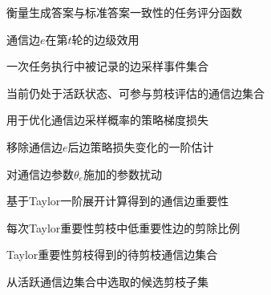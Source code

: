 \begin{symbols}
  \item[$S(\hat{y},y)$] 衡量生成答案与标准答案一致性的任务评分函数
  \item[$R_e^{(t)}$] 通信边$e$在第$t$轮的边级效用
  \item[$\mathcal{E}_{\mathrm{sample}}$] 一次任务执行中被记录的边采样事件集合
  \item[$\mathcal{E}_{\mathrm{active}}$] 当前仍处于活跃状态、可参与剪枝评估的通信边集合
  \item[$\mathcal{L}_{\mathrm{pg}}$] 用于优化通信边采样概率的策略梯度损失
  \item[$\Delta\mathcal{L}_{\mathrm{pg},e}$] 移除通信边$e$后边策略损失变化的一阶估计
  \item[$\Delta\theta_e$] 对通信边参数$\theta_e$施加的参数扰动
  \item[$I_e$] 基于Taylor一阶展开计算得到的通信边重要性
  \item[$\rho$] 每次Taylor重要性剪枝中低重要性边的剪除比例
  \item[$\mathcal{P}$] Taylor重要性剪枝得到的待剪枝通信边集合
  \item[$\mathcal{S}$] 从活跃通信边集合中选取的候选剪枝子集
\end{symbols}
